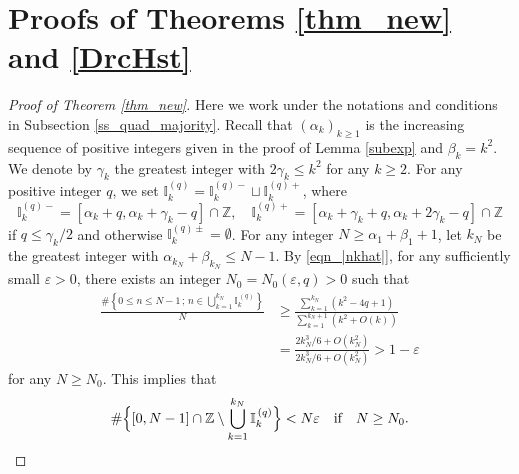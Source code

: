 \documentclass{amsart}
\theoremstyle{definition}
\numberwithin{equation}{section}
\numberwithin{figure}{section}
\begin{document}
\section{Proofs of Theorems \ref{thm_new} and \ref{DrcHst}}\label{S_Proof_thms}
\begin{proof}[Proof of Theorem \ref{thm_new}]
Here we work under the notations and conditions in Subsection  \ref{ss_quad_majority}.
Recall that $(\alpha_k)_{k\geq 1}$ is the increasing sequence of positive integers given in 
the proof of Lemma \ref{subexp}
and $\beta_k=k^2$.
We denote by $\gamma_k$ the greatest integer with $2\gamma_k\leq k^2$ for any $k\geq 2$.
For any positive integer $q$, we set $\mathbb{I}_k^{(q)}=\mathbb{I}_k^{(q)-}\sqcup \mathbb{I}_k^{(q)+}$, where
$$\mathbb{I}_k^{(q)-}= [\alpha_k+q,\alpha_k+\gamma_k-q]\cap 
\mathbb{Z}, \quad\mathbb{I}_k^{(q)+}=[\alpha_k+\gamma_k+q,\alpha_k+2\gamma_k-q]\cap 
\mathbb{Z}$$ 
if $q\leq \gamma_k/2$ and otherwise $\mathbb{I}_k^{(q)\pm}=\emptyset$.
For any integer $N\geq \alpha_1+\beta_1+1$, let $k_N$ be the greatest integer with 
$\alpha_{k_N}+\beta_{k_N}\leq N-1$.
By \eqref{eqn_|nkhat|}, for any sufficiently small $\varepsilon >0$, there exists an integer $N_0=N_0(\varepsilon,q)>0$ 
such that
\begin{equation}\label{eqn_I(q)N}
\begin{split}
\frac{\#\left\{ 0\le n \le N-1 \, ;\,  n \in \bigcup_{k=1}^{k_N} \mathbb{I}_k^{\,(q)}\right\}}{N}
&\geq 
\frac{\sum_{k=1}^{k_{N}}(k^2-4q+1)}{ \sum_{k=1}^{k_N+1}(k^2+O(k))}\\
&=\frac{2k_N^{3}/6+O(k_N^{2})}{2k_N^{3}/6+O(k_N^{2})}>1-\varepsilon
\end{split}
\end{equation}
for any $N\geq N_0$.
This implies that  
\begin{equation}\label{eqn_Nepsilon}
\#\Bigl\{[0,N-1]\cap \mathbb{Z}\setminus \bigcup _{k=1}^{k_N} \mathbb{I}_k^{\,(q)}\Bigr\}<N\varepsilon
\quad\text{if}\quad N\geq N_0.
\end{equation}





\end{proof}
\end{document}
